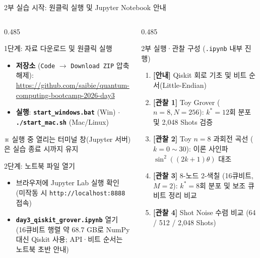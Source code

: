 \documentclass[aspectratio=169, 10pt]{beamer}
\begin{document}
\begin{frame}{2부 실습 시작: 원클릭 실행 및 Jupyter Notebook 안내}
    \begin{columns}[T]
        \begin{column}{0.485\textwidth}
            \begin{qcblock}{1단계: 자료 다운로드 및 원클릭 실행}
                \begin{itemize}
                    \item \textbf{저장소} (\texttt{Code} $\to$ \texttt{Download ZIP} 압축 해제):\\
                    {\scriptsize \url{https://github.com/saibie/quantum-computing-bootcamp-2026-day3}}
                    \item \textbf{실행}: \texttt{\textbf{start\_windows.bat}} (Win) $\cdot$ \texttt{\textbf{./start\_mac.sh}} (Mac/Linux)
                \end{itemize}
                {\scriptsize ※ 실행 중 열리는 터미널 창(Jupyter 서버)은 실습 종료 시까지 유지}
            \end{qcblock}
            \vspace{0.08cm}
            \begin{qctip}{2단계: 노트북 파일 열기}
                \begin{itemize}
                    \item 브라우저에 Jupyter Lab 실행 확인 (미작동 시 \texttt{http://localhost:8888} 접속)
                    \item \texttt{\textbf{day3\_qiskit\_grover.ipynb}} 열기\\
                    {\scriptsize (16큐비트 행렬 약 68.7 GB로 NumPy 대신 Qiskit 사용; API·비트 순서는 노트북 초반 안내)}
                \end{itemize}
            \end{qctip}
        \end{column}
        \begin{column}{0.485\textwidth}
            \begin{qcblock}{2부 실행·관찰 구성 (\texttt{.ipynb} 내부 진행)}
                \begin{enumerate}
                    \item \textbf{[안내]} Qiskit 회로 기초 및 비트 순서(Little-Endian)
                    \item \textbf{[관찰 1]} Toy Grover ($n=8, N=256$): $k^*=12$회 분포 및 2,048 Shots 검증
                    \item \textbf{[관찰 2]} Toy $n=8$ 과회전 곡선 ($k=0\sim 30$): 이론 사인파 $\sin^2((2k+1)\theta)$ 대조
                    \item \textbf{[관찰 3]} 8-노드 2-색칠 (16큐비트, $M=2$): $k^*=8$회 분포 및 보조 큐비트 정리 비교
                    \item \textbf{[관찰 4]} Shot Noise 수렴 비교 (64 / 512 / 2,048 Shots)
                \end{enumerate}
            \end{qcblock}
        \end{column}
    \end{columns}
\end{frame}
\end{document}
